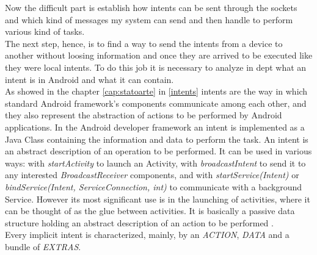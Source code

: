 Now the difficult part is establish how intents can be sent through the sockets and which kind of messages my system can send and then handle to perform various kind of tasks.\\
The next step, hence, is to find a way to send the intents from a device to another without loosing information and once they are arrived to be executed like they were local intents. To do this job it is necessary to analyze in dept what an intent is in Android and what it can contain.\\
As showed in the chapter \ref{cap:statoarte} in \ref{intents} intents are the way in which standard Android framework's components communicate among each other, and they also represent the abstraction of actions to be performed by Android applications. In the Android developer framework an intent is implemented as a Java Class containing the information and data to perform the task. An intent is an abstract description of an operation to be performed. It can be used in various ways: with \textit{startActivity} to launch an Activity, with \textit{broadcastIntent} to send it to any interested \textit{BroadcastReceiver} components, and  with \textit{startService(Intent)} or \textit{bindService(Intent, ServiceConnection, int)} to communicate with a background Service. However its most significant use is in the launching of activities, where it can be thought of as the glue between activities. It is basically a passive data structure holding an abstract description of an action to be performed \cite{android2017intent}.\\
Every implicit intent is characterized, mainly, by an \textit{ACTION}, \textit{DATA} and a bundle of \textit{EXTRAS}.
